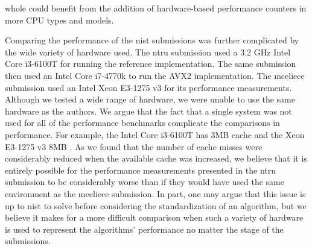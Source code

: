 whole could benefit from the addition of hardware-based performance counters in more CPU types and models.

Comparing the performance of the \gls{nist} submissions was further complicated by the wide variety of hardware used. The \gls{ntru} submission \cite{ntru2020} used a 3.2 GHz Intel Core i3-6100T for running the reference implementation. The same submission then used an Intel Core i7-4770k to run the AVX2 implementation. The \gls{mceliece} submission \cite{mceliece2020} used an Intel Xeon E3-1275 v3 for its performance measurements. Although we tested a wide range of hardware, we were unable to use the same hardware as the authors. We argue that the fact that a single system was not used for all of the performance benchmarks complicate the comparisons in performance. For example, the Intel Core i3-6100T has 3MB cache \cite{i36100t} and the Xeon E3-1275 v3 8MB \cite{xeon31275}. As we found that the number of cache misses were considerably reduced when the available cache was increased, we believe that it is entirely possible for the performance measurements presented in the \gls{ntru} submission to be considerably worse than if they would have used the same environment as the \gls{mceliece} submission. In part, one may argue that this issue is up to \gls{nist} to solve before considering the standardization of an algorithm, but we believe it makes for a more difficult comparison when such a variety of hardware is used to represent the algorithms' performance no matter the stage of the submissions.


